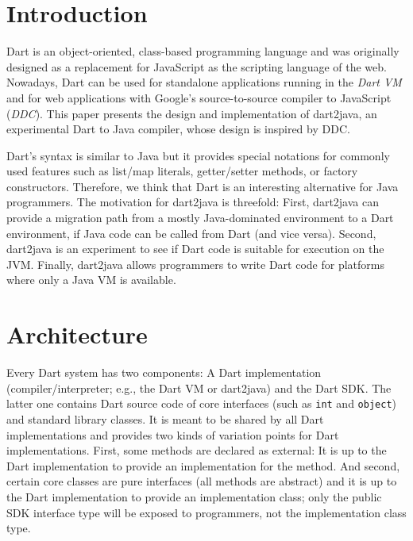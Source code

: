 \documentclass[sigplan]{acmart}
\begin{document}

\maketitle

\section{Introduction}
Dart is an object-oriented, class-based programming language and was originally designed as a replacement for JavaScript as the scripting language of the web. Nowadays, Dart can be used for standalone applications running in the \emph{Dart VM} and for web applications with Google's source-to-source compiler to JavaScript (\emph{DDC}). This paper presents the design and implementation of dart2java, an experimental Dart to Java compiler, whose design is inspired by DDC.

Dart's syntax is similar to Java but it provides special notations for commonly used features such as list/map literals, getter/setter methods, or factory constructors. Therefore, we think that Dart is an interesting alternative for Java programmers. The motivation for dart2java is threefold: First, dart2java can provide a migration path from a mostly Java-dominated environment to a Dart environment, if Java code can be called from Dart (and vice versa). Second, dart2java is an experiment to see if Dart code is suitable for execution on the JVM. Finally, dart2java allows programmers to write Dart code for platforms where only a Java VM is available. %
 
\section{Architecture}
Every Dart system has two components: A Dart implementation (compiler/interpreter; e.g., the Dart VM or dart2java) and the Dart SDK. The latter one contains Dart source code of core interfaces (such as \texttt{int} and \texttt{object}) and standard library classes. It is meant to be shared by all Dart implementations and provides two kinds of variation points for Dart implementations. First, some methods are declared as external: It is up to the Dart implementation to provide an implementation for the method. And second, certain core classes are pure interfaces (all methods are abstract) and it is up to the Dart implementation to provide an implementation class; only the public SDK interface type will be exposed to programmers, not the implementation class type.
\end{document}
